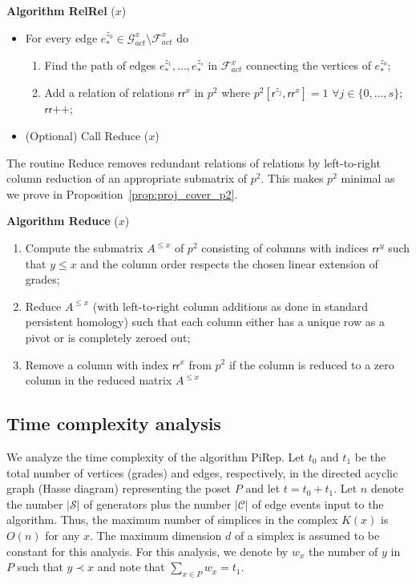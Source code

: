 \documentclass[english,a4paper,nolineno,cleveref]{socg-lipics-v2021}
\newcommand{\G}{\mathcal G}
\newcommand{\F}{\mathcal F}
\newcommand{\Scal}{\mathcal S}
\newcommand{\Ccal}{\mathcal C}
\def\rsf{\mathsf{r}}
\def\rrsf{\mathsf{rr}}
\begin{document}
\vspace{0.1in}
\noindent
{\bf Algorithm {\sc RelRel}} ($x$)
\begin{itemize}
      \item For every edge $e_*^{z_0}\in  \G_{act}^{x}\setminus \F_{act}^{x}$ do
        \begin{enumerate}
            \item Find the path of edges $e_*^{z_1},\ldots, e_*^{z_s}$ in $\F_{act}^{x}$
            connecting the vertices of $e_*^{z_0}$;
            \item Add a relation of relations $\rrsf^{x}$ in $p^2$ where
            $p^2[\rsf^{z_j},\rrsf^{x}]=1$ $\forall j\in\{0,\ldots,s\}$; $\rrsf\texttt{++}$;
        \end{enumerate}
        \item (Optional) Call {\sc Reduce} ($x$)
\end{itemize}

The routine {\sc Reduce} removes redundant relations of relations by left-to-right column reduction of an appropriate submatrix of $p^2$. This makes $p^2$ minimal as we prove in Proposition~\ref{prop:proj_cover_p2}.

\vspace{0.1in}
\noindent
{\bf Algorithm {\sc Reduce}} ($x$)
\begin{enumerate}
    \item Compute the submatrix $A^{\leq x}$ of $p^2$ consisting of columns with indices
    $\rrsf^y$ such that $y\leq x$ and the column order 
    respects the chosen linear extension of grades;
    \item Reduce $A^{\leq x}$ (with left-to-right column additions as done in standard persistent homology)
    such that each column either has
    a unique row as a pivot or is completely zeroed out;
    \item Remove a column with index $\rrsf^{x}$ from $p^2$ if the column is reduced
    to a zero column in the reduced matrix $A^{\leq x}$
\end{enumerate}

\subsection{Time complexity analysis} \label{subsec:complexity_analysis}

We analyze the time complexity of the algorithm {\sc PiRep}. Let $t_0$ and $t_1$ be the total number of vertices (grades) and edges, respectively, in the directed acyclic graph (Hasse diagram) representing the poset $P$ and let $t=t_0+t_1$. Let $n$ denote the number $|\Scal|$ of generators plus the number $|\Ccal|$ of edge events input to the algorithm. 
Thus, the maximum number of simplices
in the complex $K(x)$ is $O(n)$ for any $x$. The maximum dimension
$d$ of a simplex is assumed to be constant for this analysis. For this analysis, we denote by $w_x$ the number of $y$ in $P$ such that $y\prec x$ and note that $\sum_{x\in P}w_x=t_1$.
\end{document}
